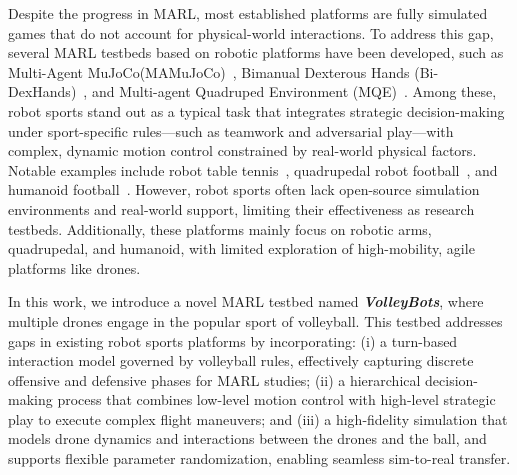 Despite the progress in MARL, most established platforms are fully simulated games that do not account for physical-world interactions. To address this gap, several MARL testbeds based on robotic platforms have been developed, such as Multi-Agent MuJoCo(MAMuJoCo)~\cite{peng2021facmac}, Bimanual Dexterous Hands (Bi-DexHands)~\cite{chen2022humanlevelbimanualdexterousmanipulation}, and Multi-agent Quadruped Environment (MQE)~\cite{xiong2024mqe}. Among these, robot sports stand out as a typical task that integrates strategic decision-making under sport-specific rules—such as teamwork and adversarial play—with complex, dynamic motion control constrained by real-world physical factors. Notable examples include robot table tennis~\cite{d2024achieving}, quadrupedal robot football~\cite{ji2022hierarchicalreinforcementlearningprecise}, and humanoid football~\cite{liu2022motor,haarnoja2024learning}. However, robot sports often lack open-source simulation environments and real-world support, limiting their effectiveness as research testbeds. Additionally, these platforms mainly focus on robotic arms, quadrupedal, and humanoid, with limited exploration of high-mobility, agile platforms like drones.

In this work, we introduce a novel MARL testbed named \textbf{\textit{VolleyBots}}, where multiple drones engage in the popular sport of volleyball. This testbed addresses gaps in existing robot sports platforms by incorporating: 
(i) a turn-based interaction model governed by volleyball rules, effectively capturing discrete offensive and defensive phases for MARL studies; 
(ii) a hierarchical decision-making process that combines low-level motion control with high-level strategic play to execute complex flight maneuvers; and
(iii) a high-fidelity simulation that models drone dynamics and interactions between the drones and the ball, and supports flexible parameter randomization, enabling seamless sim-to-real transfer.

